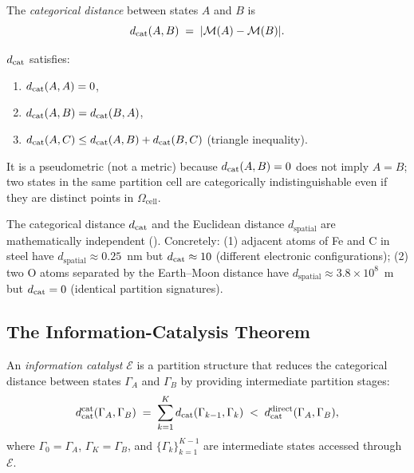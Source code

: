 \begin{definition}
\label{def:cat-distance}
The \emph{categorical distance} between states $A$ and $B$ is
\begin{equation}
    d_{\mathrm{cat}}(A,B) \;=\; |\mathcal{M}(A) - \mathcal{M}(B)|.
    \label{eq:dcat}
\end{equation}
\end{definition}

\begin{proposition}
\label{prop:dcat-metric}
$d_{\mathrm{cat}}$ satisfies:
\begin{enumerate}[label=(\roman*)]
    \item $d_{\mathrm{cat}}(A,A) = 0$,
    \item $d_{\mathrm{cat}}(A,B) = d_{\mathrm{cat}}(B,A)$,
    \item $d_{\mathrm{cat}}(A,C) \le d_{\mathrm{cat}}(A,B) + d_{\mathrm{cat}}(B,C)$ (triangle inequality).
\end{enumerate}
It is a pseudometric (not a metric) because $d_{\mathrm{cat}}(A,B) = 0$ does not imply
$A = B$; two states in the same partition cell are categorically
indistinguishable even if they are distinct points in $\Omega_\mathrm{cell}$.
\end{proposition}

\begin{remark}
The categorical distance $d_{\mathrm{cat}}$ and the Euclidean distance $d_\mathrm{spatial}$
are mathematically independent ().  Concretely: (1) adjacent
atoms of Fe and C in steel have $d_\mathrm{spatial} \approx 0.25$~nm but
$d_{\mathrm{cat}} \approx 10$ (different electronic configurations); (2) two O atoms
separated by the Earth--Moon distance have $d_\mathrm{spatial} \approx 3.8
\times 10^8$~m but $d_{\mathrm{cat}} = 0$ (identical partition signatures).
\end{remark}

\subsection{The Information-Catalysis Theorem}

\begin{definition}
\label{def:info-catalyst-obs}
An \emph{information catalyst} $\mathcal{E}$ is a partition structure that
reduces the categorical distance between states $\Gamma_A$ and $\Gamma_B$ by
providing intermediate partition stages:
\[
    d_{\mathrm{cat}}^\mathrm{cat}(\Gamma_A, \Gamma_B)
    \;=\; \sum_{k=1}^{K} d_{\mathrm{cat}}(\Gamma_{k-1}, \Gamma_k)
    \;<\; d_{\mathrm{cat}}^\mathrm{direct}(\Gamma_A, \Gamma_B),
\]
where $\Gamma_0 = \Gamma_A$, $\Gamma_K = \Gamma_B$, and
$\{\Gamma_k\}_{k=1}^{K-1}$ are intermediate states accessed through
$\mathcal{E}$.
\end{definition}

